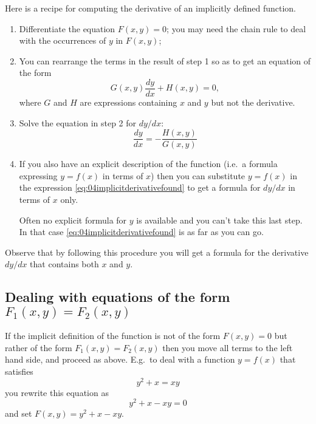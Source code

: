 Here is a recipe for computing the derivative of an implicitly defined
function.
\begin{enumerate}
\item Differentiate the equation $F(x, y)=0$; you may need the chain
  rule to deal with the occurrences of $y$ in $F(x, y)$;




\item You can rearrange the terms in the result of step 1 so as to get
  an equation of the form
  \begin{equation}\label{eq:04imp-deriv-step2}
    G(x, y)\dfrac{dy}{dx}+H(x, y)=0,
  \end{equation}
  where $G$ and $H$ are expressions containing $x$ and $y$ but not the
  derivative.




\item Solve the equation in step 2 for ${dy}/{dx}$:
  \begin{equation}\label{eq:04implicitderivativefound}
    \frac{dy}{dx} = -\frac{H(x, y)}{G(x, y)}
  \end{equation}




\item If you also have an explicit description of the function (i.e.\
  a formula expressing $y=f(x)$ in terms of $x$) then you can
  substitute $y=f(x)$ in the expression
  \eqref{eq:04implicitderivativefound} to get a formula for $dy/dx$ in
  terms of $x$ only.




  Often no explicit formula for $y$ is available and you can't take
  this last step.  In that case \eqref {eq:04implicitderivativefound}
  is as far as you can go.
\end{enumerate}
Observe that by following this procedure you will get a formula for
the derivative ${dy}/{dx}$ that contains both $x$ and $y$.
\subsection{Dealing with equations of the form $F_1(x,y) = F_2(x, y)$} 
If the implicit definition of the function is not of the form $F(x,y)=0$ but
rather of the form $F_1(x,y) = F_2(x, y)$ then you move all terms to the
left hand side, and proceed as above.  E.g.\ to deal with a function $y=f(x)$
that satisfies
\[
y^2+x = xy
\]
you rewrite this equation as
\[
y^2+x-xy = 0
\]
and set $F(x, y) = y^2+x-xy$.




